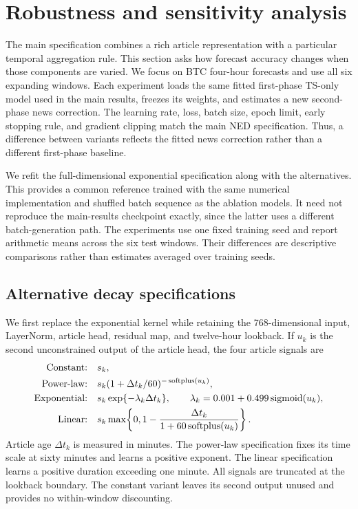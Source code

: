 \section{Robustness and sensitivity analysis}
\label{sec:robustness}

The main specification combines a rich article representation with a
particular temporal aggregation rule. This section asks how forecast
accuracy changes when those components are varied. We focus on BTC
four-hour forecasts and use all six expanding windows. Each experiment
loads the same fitted first-phase TS-only model used in the main
results, freezes its weights, and estimates a new second-phase news
correction. The learning rate, loss, batch size, epoch limit, early
stopping rule, and gradient clipping match the main NED specification.
Thus, a difference between variants reflects the fitted news
correction rather than a different first-phase baseline.

We refit the full-dimensional exponential specification along with
the alternatives. This provides a common reference trained with the
same numerical implementation and shuffled batch sequence as the
ablation models. It need not reproduce the main-results checkpoint
exactly, since the latter uses a different batch-generation path.
The experiments use one fixed training seed and report arithmetic
means across the six test windows. Their differences are descriptive
comparisons rather than estimates averaged over training seeds.

\subsection{Alternative decay specifications}
\label{sec:decay_ablation}

We first replace the exponential kernel while retaining the
768-dimensional input, LayerNorm, article head, residual map, and
twelve-hour lookback. If $u_k$ is the second unconstrained output
of the article head, the four article signals are
\begin{align*}
 \text{Constant:}\quad &s_k,\\
 \text{Power-law:}\quad
 &s_k(1+\Delta t_k/60)^{-\operatorname{softplus}(u_k)},\\
 \text{Exponential:}\quad
 &s_k\exp\{-\lambda_k\Delta t_k\},
 \qquad \lambda_k=0.001+0.499\operatorname{sigmoid}(u_k),\\
 \text{Linear:}\quad
 &s_k\max\!\left\{0,1-\frac{\Delta t_k}{1+60\operatorname{softplus}(u_k)}\right\}.
\end{align*}
Article age $\Delta t_k$ is measured in minutes. The power-law
specification fixes its time scale at sixty minutes and learns a
positive exponent. The linear specification learns a positive
duration exceeding one minute. All signals are truncated at the
lookback boundary. The constant variant leaves its second output
unused and provides no within-window discounting.

